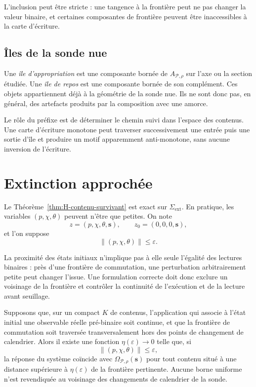 L'inclusion peut être stricte : une tangence à la frontière peut ne pas
changer la valeur binaire, et certaines composantes de frontière peuvent
être inaccessibles à la carte d'écriture.

\subsection{Îles de la sonde nue}
\label{annexe-H-iles}

Une \emph{île d'appropriation} est une composante bornée de
$A_{\mathcal P,\rho}$ sur l'axe ou la section étudiée. Une \emph{île de
repos} est une composante bornée de son complément. Ces objets
appartiennent déjà à la géométrie de la sonde nue. Ils ne sont donc pas,
en général, des artefacts produits par la composition avec une amorce.

Le rôle du préfixe est de déterminer le chemin suivi dans l'espace des
contenus. Une carte d'écriture monotone peut traverser successivement
une entrée puis une sortie d'île et produire un motif apparemment
anti-monotone, sans aucune inversion de l'écriture.

\section{Extinction approchée}
\label{annexe-H-extinction-approchee}

Le Théorème~\ref{thm:H-contenu-survivant} est exact sur $\Sigma_{\mathrm{ext}}$. En pratique, les
variables $(p,\chi,\theta)$ peuvent n'être que petites. On note
\[
z=(p,\chi,\theta,\mathbf s),
\qquad
z_0=(0,0,0,\mathbf s),
\]
et l'on suppose
\[
\|(p,\chi,\theta)\|\leq\varepsilon.
\]

La proximité des états initiaux n'implique pas à elle seule l'égalité
des lectures binaires : près d'une frontière de commutation, une
perturbation arbitrairement petite peut changer l'issue. Une formulation
correcte doit donc exclure un voisinage de la frontière et contrôler la
continuité de l'exécution et de la lecture avant seuillage.

\begin{encadre}[title={Proposition \theproposition{} --- Extinction approchée, énoncé conditionnel}]
Supposons que, sur un compact $K$ de contenus, l'application qui associe
à l'état initial une observable réelle pré-binaire soit continue, et que
la frontière de commutation soit traversée transversalement hors des
points de changement de calendrier. Alors il existe une fonction
$\eta(\varepsilon)\to0$ telle que, si
\[
\|(p,\chi,\theta)\|\leq\varepsilon,
\]
la réponse du système coïncide avec
$\Omega_{\mathcal P,\rho}(\mathbf s)$ pour tout contenu situé à une
distance supérieure à $\eta(\varepsilon)$ de la frontière pertinente.
Aucune borne uniforme n'est revendiquée au voisinage des changements de
calendrier de la sonde.
\end{encadre}

